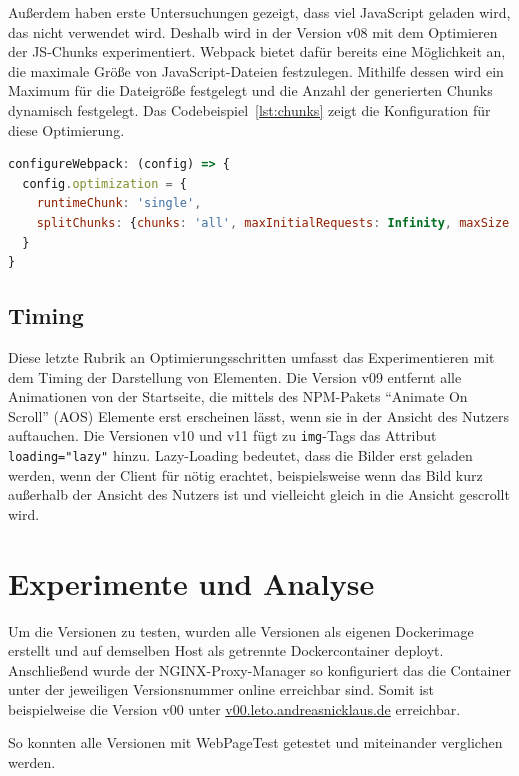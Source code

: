 \documentclass[11pt,a4paper]{article}
\begin{document}
Außerdem haben erste Untersuchungen gezeigt, dass viel JavaScript geladen wird, das nicht verwendet wird.
Deshalb wird in der Version v08 mit dem Optimieren der JS-Chunks experimentiert.
Webpack bietet dafür bereits eine Möglichkeit an, die maximale Größe von JavaScript-Dateien festzulegen.
Mithilfe dessen wird ein Maximum für die Dateigröße festgelegt und die Anzahl der generierten Chunks dynamisch festgelegt.
Das Codebeispiel~\ref{lst:chunks} zeigt die Konfiguration für diese Optimierung.

\begin{lstlisting}[language=JavaScript, caption={Konfiguration von Webpack zur Limitierung der Chunkgröße}, label={lst:chunks}]
configureWebpack: (config) => {
  config.optimization = {
    runtimeChunk: 'single',
    splitChunks: {chunks: 'all', maxInitialRequests: Infinity, maxSize: 500000}
  }
}
\end{lstlisting}

\subsection{Timing}
Diese letzte Rubrik an Optimierungsschritten umfasst das Experimentieren mit dem Timing der Darstellung von Elementen.
Die Version v09 entfernt alle Animationen von der Startseite, die mittels des NPM-Pakets \enquote{Animate On Scroll} (AOS) Elemente erst erscheinen lässt, wenn sie in der Ansicht des Nutzers auftauchen.
Die Versionen v10 und v11 fügt zu \verb|img|-Tags das Attribut \verb|loading="lazy"| hinzu.
Lazy-Loading bedeutet, dass die Bilder erst geladen werden, wenn der Client für nötig erachtet, beispielsweise wenn das Bild kurz außerhalb der Ansicht des Nutzers ist und vielleicht gleich in die Ansicht gescrollt wird.

\section{Experimente und Analyse}\label{sec:experimente}
Um die Versionen zu testen, wurden alle Versionen als eigenen Dockerimage erstellt und auf demselben Host als getrennte Dockercontainer deployt.
Anschließend wurde der NGINX-Proxy-Manager so konfiguriert das die Container unter der jeweiligen Versionsnummer online erreichbar sind.
Somit ist beispielweise die Version v00 unter \href{https://v00.leto.andreasnicklaus.de}{v00.leto.andreasnicklaus.de} erreichbar.

So konnten alle Versionen mit WebPageTest getestet und miteinander verglichen werden.
\end{document}
